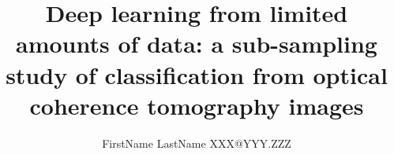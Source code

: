 \documentclass[twoside,11pt]{article}
\begin{document}
\title{Deep learning from limited amounts of data: a sub-sampling study of classification from optical coherence tomography images}



\author{\name FirstName LastName \email XXX@YYY.ZZZ}

\maketitle









\end{document}
